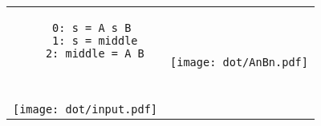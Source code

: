 \documentclass{article} %
\begin{document}
\pagestyle{empty}


\begin{table}
\begin{center}
\begin{tabular}{c c}

\begin{minipage}{0.4\textwidth}

{\Huge
\begin{verbatim}
   0: s = A s B 
   1: s = middle
   2: middle = A B



\end{verbatim}
      }
\end{minipage}
&
\multirow{2}{*}{
\begin{minipage}{0.6\textwidth}
\vspace{-5cm}
        \texttt{[image: dot/AnBn.pdf]}
\end{minipage}
}
\\
\begin{minipage}{0.4\textwidth}
    \texttt{[image: dot/input.pdf]}
\end{minipage}
\end{tabular}
\end{center}
\end{table}


%
%
%
%

%
%
\end{document}
